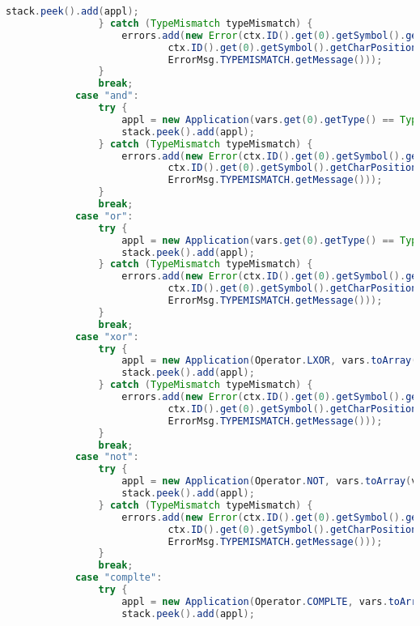 \begin{landscape}
\begin{lstlisting}[language=Java]
                    stack.peek().add(appl);
                } catch (TypeMismatch typeMismatch) {
                    errors.add(new Error(ctx.ID().get(0).getSymbol().getLine(),
                            ctx.ID().get(0).getSymbol().getCharPositionInLine(),
                            ErrorMsg.TYPEMISMATCH.getMessage()));
                }
                break;
            case "and":
                try {
                    appl = new Application(vars.get(0).getType() == Type.BOOL ? Operator.AND : Operator.LAND, vars.toArray(varArr));
                    stack.peek().add(appl);
                } catch (TypeMismatch typeMismatch) {
                    errors.add(new Error(ctx.ID().get(0).getSymbol().getLine(),
                            ctx.ID().get(0).getSymbol().getCharPositionInLine(),
                            ErrorMsg.TYPEMISMATCH.getMessage()));
                }
                break;
            case "or":
                try {
                    appl = new Application(vars.get(0).getType() == Type.BOOL ? Operator.OR : Operator.LOR, vars.toArray(varArr));
                    stack.peek().add(appl);
                } catch (TypeMismatch typeMismatch) {
                    errors.add(new Error(ctx.ID().get(0).getSymbol().getLine(),
                            ctx.ID().get(0).getSymbol().getCharPositionInLine(),
                            ErrorMsg.TYPEMISMATCH.getMessage()));
                }
                break;
            case "xor":
                try {
                    appl = new Application(Operator.LXOR, vars.toArray(varArr));
                    stack.peek().add(appl);
                } catch (TypeMismatch typeMismatch) {
                    errors.add(new Error(ctx.ID().get(0).getSymbol().getLine(),
                            ctx.ID().get(0).getSymbol().getCharPositionInLine(),
                            ErrorMsg.TYPEMISMATCH.getMessage()));
                }
                break;
            case "not":
                try {
                    appl = new Application(Operator.NOT, vars.toArray(varArr));
                    stack.peek().add(appl);
                } catch (TypeMismatch typeMismatch) {
                    errors.add(new Error(ctx.ID().get(0).getSymbol().getLine(),
                            ctx.ID().get(0).getSymbol().getCharPositionInLine(),
                            ErrorMsg.TYPEMISMATCH.getMessage()));
                }
                break;
            case "complte":
                try {
                    appl = new Application(Operator.COMPLTE, vars.toArray(varArr));
                    stack.peek().add(appl);

\end{lstlisting}
\end{landscape}
